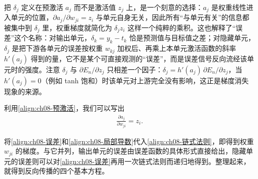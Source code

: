 \documentclass[../../main.tex]{subfiles}
\begin{document}
\begin{remark}
把 $\delta_j$ 定义在预激活 $a_j$ 而不是激活值 $z_j$ 上，是一个刻意的选择：$a_j$ 是权重线性进入单元的位置，$\partial a_j/\partial w_{ji}=z_i$ 与单元自身无关，因此所有“与单元有关”的信息都被集中到 $\delta_j$ 里，权重梯度就简化为 $\delta_j z_i$ 这样一个纯粹的乘积。这也解释了“误差”这个名称：对输出单元，$\delta_k=y_k-t_k$ 恰是预测值与目标值之差；对隐藏单元，$\delta_j$ 是把下游各单元的误差按权重 $w_{kj}$ 加权后、再乘上本单元激活函数的斜率 $h'(a_j)$ 得到的量，它不是某个可直接观测的“误差”，而是误差信号反向流经该单元时的强度。注意 $\delta_j$ 与 $\partial E_n/\partial z_j$ 只相差一个因子：$\delta_j=h'(a_j)\,\partial E_n/\partial z_j$，当 $h'(a_j)=0$（例如 tanh 饱和）时该单元对上游完全没有影响，这正是梯度消失现象的来源。
\end{remark}

利用\eqref{align:ch08-预激活}，我们可以写出
\begin{align}
\frac{\partial a_j}{\partial w_{ji}}=z_i.
\label{align:ch08-局部导数}
\end{align}

将\eqref{align:ch08-误差}和\eqref{align:ch08-局部导数}代入\eqref{align:ch08-链式法则}，即得到权重 $w_{ji}$ 的梯度。与它并列，输出单元的误差由误差函数的具体形式直接给出，隐藏单元的误差则可以对\eqref{align:ch08-误差}再用一次链式法则而递归地得到。整理起来，就得到反向传播的四个基本方程。
\end{document}
